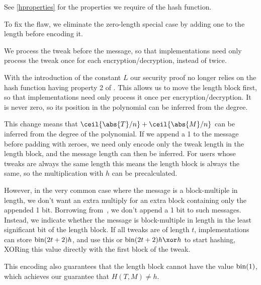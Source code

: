 \documentclass[hctr.tex]{subfiles}
\begin{document}
See \autoref{hproperties}
for the properties we require of the hash function.

To fix the \cite{kumarhctr} flaw, we eliminate the zero-length special case
by adding one to the length before encoding it.

We process the tweak before the message, so that implementations need only
process the tweak once for each encryption/decryption, instead of twice.

With the introduction of the constant \(L\)
our security proof no longer relies on the hash function
having property 2 of \cite[Section~3.3]{hctr}.
This allows us to move the length block first, so
that implementations need only process it once per encryption/decryption.
It is never zero, so its position in the
polynomial can be inferred from the degree.

This change means that \(\ceil{\abs{T}/n} + \ceil{\abs{M}/n}\)
can be inferred from the degree of the polynomial.  
If we append a 1 to the message before padding with zeroes,
we need only encode only the tweak length in the length block,
and the message length can then be inferred.
For users whose tweaks are always the same length
this means the length block is always the same, 
so the multiplication with \(h\) can be
precalculated.

However, in the very common case where the message
is a block-multiple in length,
we don't want an extra multiply
for an extra block containing only the appended 1 bit.
Borrowing from~\cite{xcbc},
we don't append a 1 bit to such messages.
Instead, we indicate whether the message is block-multiple in length
in the least significant bit of the length block.
If all tweaks are of length \(t\), implementations can store
\(\operatorname{bin}(2t + 2)h\), and use this or \(\fromint(2t + 2)h \xor h\)
to start hashing, XORing this value directly with the
first block of the tweak.

This encoding also guarantees that the length block
cannot have the value \(\operatorname{bin}(1)\), which achieves
our guarantee that \(H(T, M) \neq h\).

\end{document}
